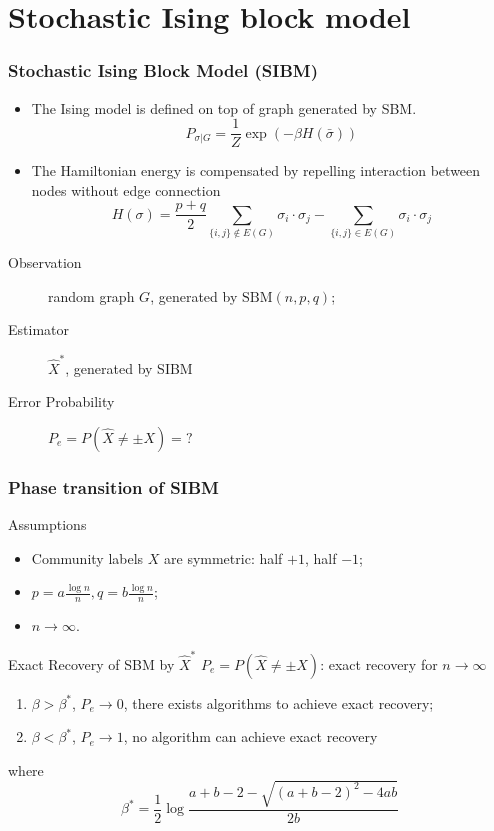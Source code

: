 \documentclass[notheorems]{beamer}
\begin{document}
\section{Stochastic Ising block model}
\frame{\tableofcontents[currentsection]}
\begin{frame}
\frametitle{Stochastic Ising Block Model (SIBM)}
\begin{itemize}
\item The Ising model is defined on top of graph generated by SBM.
\begin{equation*}
P_{\sigma | G} = \frac{1}{Z} \exp(-\beta H(\bar{\sigma}))
\end{equation*}
\item The Hamiltonian energy is compensated by repelling interaction between nodes without edge connection
\begin{equation*}
H(\sigma) = \frac{p+q}{2}\sum_{\{i,j\} \not\in E(G)} \sigma_i \cdot \sigma_j - \sum_{\{i,j\} \in E(G)} \sigma_i \cdot \sigma_j
\end{equation*}
\end{itemize}
\begin{description}
	\item[Observation] random graph $G$, generated by $\textrm{SBM}(n,p,q)$;
	\item[Estimator] $\hat{X}^*$, generated by SIBM
	\item[Error Probability] $P_e=P(\hat{X} \neq \pm X) = ?$
\end{description}
\end{frame}

\begin{frame}
\frametitle{Phase transition of SIBM}
\begin{block}{Assumptions}
	\begin{itemize}
		\item Community labels $X$ are symmetric: half $+1$, half $-1$;
		\item $p = a\frac{ \log n}{n}, q = b \frac{ \log n}{n}$;
		\item $n \to \infty$.
	\end{itemize}
\end{block}
\begin{block}{Exact Recovery of SBM by $\hat{X}^*$}
	$P_e=P(\hat{X} \neq \pm X)$: exact recovery for $n \to \infty$
\begin{enumerate}
	\item $\beta > \beta^*$, $P_e \to 0$, there exists algorithms to achieve exact recovery;
	\item $\beta < \beta^*$, $P_e \to 1$, no algorithm can achieve exact recovery
\end{enumerate}
where
\begin{equation*}
\beta^* = \frac{1}{2} \log \frac{a+b-2 - \sqrt{(a+b-2)^2-4ab}}{2b}
\end{equation*}
\end{block}

\end{frame}
\end{document}
